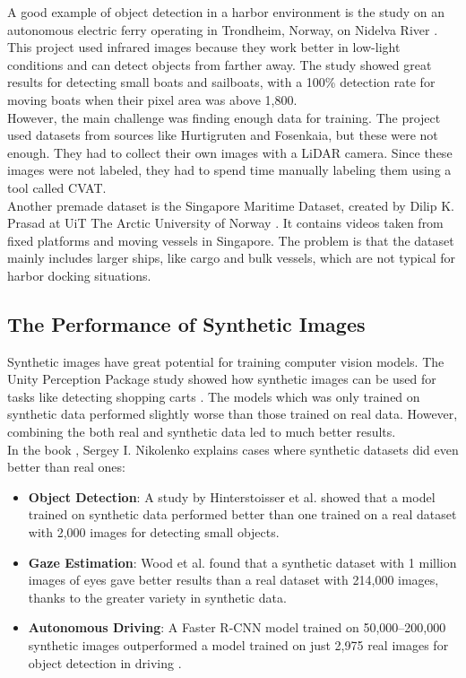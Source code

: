 A good example of object detection in a harbor environment is the study on an autonomous electric ferry operating in Trondheim, Norway, on Nidelva River \cite{NTNUFerry}. This project used infrared images because they work better in low-light conditions and can detect objects from farther away. The study showed great results for detecting small boats and sailboats, with a 100\% detection rate for moving boats when their pixel area was above 1,800. \\

\noindent However, the main challenge was finding enough data for training. The project used datasets from sources like Hurtigruten and Fosenkaia, but these were not enough. They had to collect their own images with a LiDAR camera. Since these images were not labeled, they had to spend time manually labeling them using a tool called CVAT.\\

\noindent Another premade dataset is the Singapore Maritime Dataset, created by Dilip K. Prasad at UiT The Arctic University of Norway \cite{SingaporeMaritimeDataset}. It contains videos taken from fixed platforms and moving vessels in Singapore. The problem is that the dataset mainly includes larger ships, like cargo and bulk vessels, which are not typical for harbor docking situations.

\subsection{The Performance of Synthetic Images}

Synthetic images have great potential for training computer vision models. The Unity Perception Package study showed how synthetic images can be used for tasks like detecting shopping carts \cite{borkman2021unityperceptiongeneratesynthetic}. The models which was only trained on synthetic data performed slightly worse than those trained on real data. However, combining the both real and synthetic data led to much better results. \\

\noindent In the book \cite{nikolenko2021synthetic}, Sergey I. Nikolenko explains cases where synthetic datasets did even better than real ones:
\begin{itemize}
    \item \textbf{Object Detection}: A study by Hinterstoisser et al. \cite{hinterstoisser2017pretrainedimagefeaturessynthetic} showed that a model trained on synthetic data performed better than one trained on a real dataset with 2,000 images for detecting small objects. 
    \item \textbf{Gaze Estimation}: Wood et al. \cite{wood} found that a synthetic dataset with 1 million images of eyes gave better results than a real dataset with 214,000 images, thanks to the greater variety in synthetic data. 
    \item \textbf{Autonomous Driving}: A Faster R-CNN model trained on 50,000--200,000 synthetic images outperformed a model trained on just 2,975 real images for object detection in driving \cite{r-cnn}.
\end{itemize}

